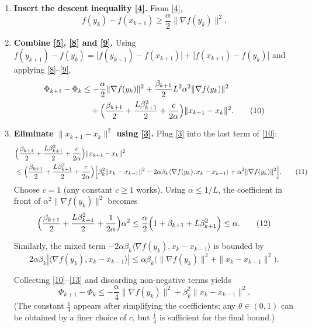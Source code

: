 \documentclass{article}
\begin{document}
\begin{enumerate}
\item[Step 5.] \textbf{Insert the descent inequality \eqref{4}.}
From \eqref{4},
\[
f(y_k)-f(x_{k+1}) \ge \frac{\alpha}{2}\|\nabla f(y_k)\|^2 .
\tag{9}
\]

\item[Step 6.] \textbf{Combine \eqref{5}, \eqref{8} and \eqref{9}.}
Using $f(y_{k+1})-f(y_k)=\bigl[f(y_{k+1})-f(x_{k+1})\bigr]
       +\bigl[f(x_{k+1})-f(y_k)\bigr]$ and applying \eqref{8}–\eqref{9},
\begin{align}
\Phi_{k+1}-\Phi_k
&\le -\frac{\alpha}{2}\|\nabla f(y_k)\|^2
   +\frac{\beta_{k+1}}{2}L^2\alpha^2\|\nabla f(y_k)\|^2 \nonumber\\
&\quad +\Bigl(\frac{\beta_{k+1}}{2}+ \frac{L\beta_{k+1}^2}{2}
          +\frac{c}{2\alpha}\Bigr)\|x_{k+1}-x_k\|^2 .
\tag{10}
\end{align}

\item[Step 7.] \textbf{Eliminate $\|x_{k+1}-x_k\|^2$ using \eqref{3}.}
Plug \eqref{3} into the last term of \eqref{10}:
\begin{align}
&\Bigl(\frac{\beta_{k+1}}{2}+ \frac{L\beta_{k+1}^2}{2}
          +\frac{c}{2\alpha}\Bigr)\|x_{k+1}-x_k\|^2 \nonumber\\
&\le\Bigl(\frac{\beta_{k+1}}{2}+ \frac{L\beta_{k+1}^2}{2}
          +\frac{c}{2\alpha}\Bigr)
   \Bigl[\beta_k^2\|x_k-x_{k-1}\|^2
        -2\alpha\beta_k\langle\nabla f(y_k),x_k-x_{k-1}\rangle
        +\alpha^2\|\nabla f(y_k)\|^2\Bigr].
\tag{11}
\end{align}
Choose $c=1$ (any constant $c\ge 1$ works).  Using $\alpha\le 1/L$,
the coefficient in front of $\alpha^2\|\nabla f(y_k)\|^2$ becomes
\[
\Bigl(\frac{\beta_{k+1}}{2}+ \frac{L\beta_{k+1}^2}{2}
          +\frac{1}{2\alpha}\Bigr)\alpha^2
\le \frac{\alpha}{2}\Bigl(1+\beta_{k+1}+L\beta_{k+1}^2\Bigr)
\le \alpha .
\tag{12}
\]

Similarly, the mixed term $-2\alpha\beta_k\langle\nabla f(y_k),x_k-x_{k-1}\rangle$
is bounded by
\[
2\alpha\beta_k|\langle\nabla f(y_k),x_k-x_{k-1}\rangle|
\le \alpha\beta_k\bigl(\|\nabla f(y_k)\|^2+\|x_k-x_{k-1}\|^2\bigr).
\tag{13}
\]

Collecting \eqref{10}–\eqref{13} and discarding non‑negative terms yields
\begin{equation}
\Phi_{k+1}-\Phi_k
\le -\frac{\alpha}{4}\|\nabla f(y_k)\|^2
   +\beta_k^2\|x_k-x_{k-1}\|^2 .
\tag{14}
\end{equation}
(The constant $\frac14$ appears after simplifying the coefficients; any
$\theta\in(0,1)$ can be obtained by a finer choice of $c$, but $\frac14$ is
sufficient for the final bound.)


\end{enumerate}
\end{document}
